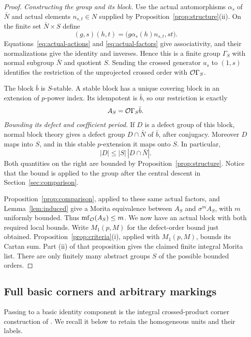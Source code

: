 \begin{proof}
\emph{Constructing the group and its block.}
Use the actual automorphisms $\alpha_s$ of $\bar N$ and actual
elements $n_{s,t}\in N$ supplied by
Proposition~\ref{prop:structure}(ii).  On the finite set
$\bar N\times S$ define
\begin{equation}\label{eq:extension-group}
 (g,s)(h,t)=\bigl(g\alpha_s(h)n_{s,t},st\bigr).
\end{equation}
Equations~\eqref{eq:actual-actions} and
\eqref{eq:actual-factors} give associativity, and their
normalizations give the identity and inverses.  Hence this is
a finite group $\Gamma_S$ with normal subgroup $\bar N$ and
quotient $S$.  Sending the crossed generator $u_s$ to $(1,s)$
identifies the restriction of the unprojected crossed order with
$\mathcal O\Gamma_S$.

The block $\bar b$ is $S$-stable.  A stable block has a unique
covering block in an extension of $p$-power index.  Its idempotent
is $\bar b$, so our restriction is exactly
\[
 A_S=\mathcal O\Gamma_S\bar b.
\]
\emph{Bounding its defect and coefficient period.}
If $D$ is a defect group of this block, normal block theory gives
a defect group $D\cap\bar N$ of $\bar b$, after conjugacy.
Moreover $D$ maps into $S$, and in this stable $p$-extension it
maps onto $S$.  In particular,
\[
 |D|\leq |S|\,|D\cap\bar N|.
\]
Both quantities on the right are bounded by
Proposition~\ref{prop:structure}.  Notice that the bound is
applied to the group after the central descent in
Section~\ref{sec:comparison}.

Proposition~\ref{prop:comparison}, applied to these same actual
factors, and Lemma~\ref{lem:induced} give a Morita equivalence
between $A_S$ and $\sigma^m A_S$, with $m$ uniformly bounded.
Thus $\operatorname{mf}_{\mathcal O}(A_S)\leq m$.  We now have an actual block with both
required local bounds.  Write $M_1(p,M)$ for the defect-order bound
just obtained.  Proposition~\ref{prop:criteria}(i), applied with
$M_1(p,M)$, bounds its Cartan sum.  Part
(ii) of that proposition gives the claimed finite integral
Morita list.  There are only finitely many abstract groups $S$
of the possible bounded orders.
\end{proof}

\subsection{Full basic corners and arbitrary markings}

Passing to a basic identity component is the integral crossed-product
corner construction of \cite[Proposition~4.15 and Corollary~4.16]{EiseleReduction2021}.
We recall it below to retain the homogeneous units and their labels.


